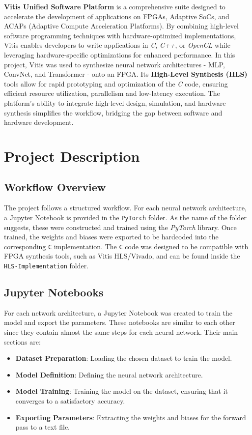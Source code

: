 \documentclass{article}
\begin{document}
\textbf{Vitis Unified Software Platform} is a comprehensive suite designed to accelerate the development of applications on FPGAs, Adaptive SoCs, and ACAPs (Adaptive Compute Acceleration Platforms). By combining high-level software programming techniques with hardware-optimized implementations, Vitis enables developers to write applications in \textit{C}, \textit{C++}, or \textit{OpenCL} while leveraging hardware-specific optimizations for enhanced performance. In this project, Vitis was used to synthesize neural network architectures - MLP, ConvNet, and Transformer - onto an FPGA. Its \textbf{High-Level Synthesis (HLS)} tools allow for rapid prototyping and optimization of the \textit{C} code, ensuring efficient resource utilization, parallelism and low-latency execution. The platform's ability to integrate high-level design, simulation, and hardware synthesis simplifies the workflow, bridging the gap between software and hardware development.


\section{Project Description}
\subsection{Workflow Overview}
The project follows a structured workflow. For each neural network architecture, a Jupyter Notebook is provided in the \texttt{PyTorch} folder. As the name of the folder suggests, these were constructed and trained using the \textit{PyTorch} library. Once trained, the weights and biases were exported to be hardcoded into the corresponding \texttt{C} implementation. The \texttt{C} code was designed to be compatible with FPGA synthesis tools, such as Vitis HLS/Vivado, and can be found inside the \texttt{HLS-Implementation} folder.

\subsection{Jupyter Notebooks}
For each network architecture, a Jupyter Notebook was created to train the model and export the parameters. These notebooks are similar to each other since they contain almost the same steps for each neural network. Their main sections are:
\begin{itemize}
    \item \textbf{Dataset Preparation}: Loading the chosen dataset to train the model.
    \item \textbf{Model Definition}: Defining the neural network architecture.
    \item \textbf{Model Training}: Training the model on the dataset, ensuring that it converges to a satisfactory accuracy.
    \item \textbf{Exporting Parameters}: Extracting the weights and biases for the forward pass to a text file.
\end{itemize}
\end{document}
